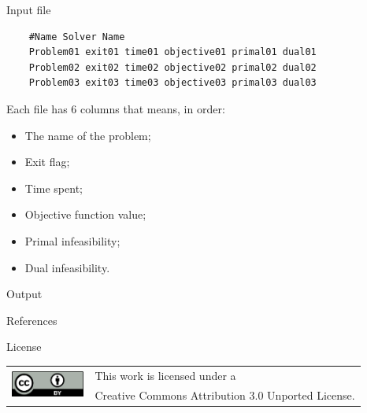 \documentclass[a0paper,portrait]{baposter}
\begin{document}
\begin{poster}
\begin{posterbox}[column=1]{Input file}
    \begin{lstlisting}
    #Name Solver Name
    Problem01 exit01 time01 objective01 primal01 dual01
    Problem02 exit02 time02 objective02 primal02 dual02
    Problem03 exit03 time03 objective03 primal03 dual03
    \end{lstlisting}

    Each file has 6 columns that means, in order:
    \begin{itemize}
      \item The name of the problem;
      \item Exit flag;
      \item Time spent;
      \item Objective function value;
      \item Primal infeasibility;
      \item Dual infeasibility.
    \end{itemize}
  \end{posterbox}

  \begin{posterbox}[column=1,below=auto]{Output}
    
  \end{posterbox}

  \begin{posterbox}[column=1,below=auto]{References}
    \printbibliography[heading=none]
  \end{posterbox}

  \begin{posterbox}[column=1,below=auto]{License}
    \begin{tabular}{cl}
      \multirow{2}{*}{\includegraphics[height=24pt]{figures/cc-by}} &
      This work is licensed under a \\
      & Creative Commons Attribution 3.0 Unported License.
    \end{tabular}
  \end{posterbox}
\end{poster}
\end{document}
